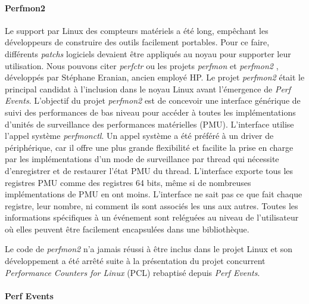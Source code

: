         \paragraph{Perfmon2}\label{sec:edl_profiling_perfmon2}
            Le support par Linux des compteurs matériels a été long, empêchant les développeurs de construire des outils facilement portables. Pour ce faire, différents \textit{patchs} logiciels devaient être appliqués au noyau pour supporter leur utilisation. Nous pouvons citer \textit{perfctr} \cite{Pettersson2005} ou les projets \textit{perfmon} et \textit{perfmon2} \cite{Eranian2006}, développés par Stéphane Eranian, ancien employé HP. Le projet \textit{perfmon2} était le principal candidat à l'inclusion dans le noyau Linux avant l'émergence de \textit{Perf Events}. L'objectif du projet \textit{perfmon2} est de concevoir une interface générique de suivi des performances de bas niveau pour accéder à toutes les implémentations d'unités de surveillance des performances matérielles (PMU).
            L'interface utilise l'appel système \textit{perfmonctl}. Un appel système a été préféré à un driver de périphérique, car il offre une plus grande flexibilité et facilite la prise en charge par les implémentations d'un mode de surveillance par thread qui nécessite d'enregistrer et de restaurer l'état PMU du \gls{thread}. L'interface exporte tous les registres PMU comme des registres 64 bits, même si de nombreuses implémentations de PMU en ont moins. L'interface ne sait pas ce que fait chaque registre, leur nombre, ni comment ils sont associés les uns aux autres. Toutes les informations spécifiques à un événement sont reléguées au niveau de l'utilisateur où elles peuvent être facilement encapsulées dans une bibliothèque.
        
            Le code de \textit{perfmon2} n'a jamais réussi à être inclus dans le projet Linux et son développement a été arrêté suite à la présentation du projet concurrent \textit{Performance Counters for Linux} (PCL) rebaptisé depuis \textit{Perf Events}.

        \paragraph{Perf Events}\label{sec:edl_profiling_perf}
        
